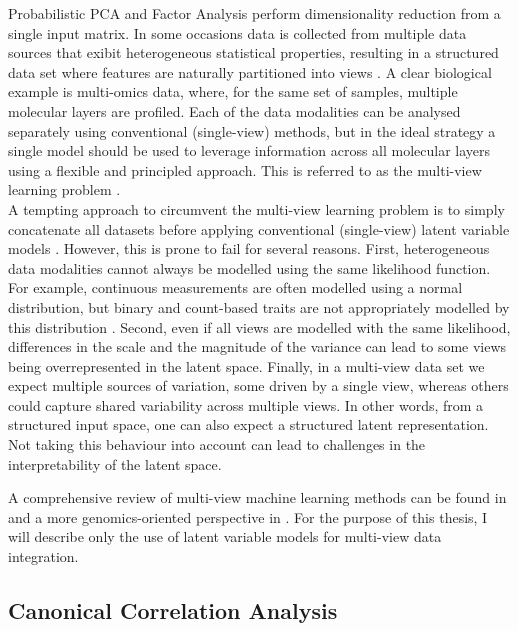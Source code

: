 Probabilistic PCA and Factor Analysis perform dimensionality reduction from a single input matrix. In some occasions data is collected from multiple data sources that exibit heterogeneous statistical properties, resulting in a structured data set where features are naturally partitioned into views \cite{Xu2013,Li2016,Zeng2018}. A clear biological example is multi-omics data, where, for the same set of samples, multiple molecular layers are profiled. Each of the data modalities can be analysed separately using conventional (single-view) methods, but in the ideal strategy a single model should be used to leverage information across all molecular layers using a flexible and principled approach. This is referred to as the multi-view learning problem \cite{Xu2013,Li2016}.\\
A tempting approach to circumvent the multi-view learning problem is to simply concatenate all datasets before applying conventional (single-view) latent variable models \cite{Ritchie2015}. However, this is prone to fail for several reasons. First, heterogeneous data modalities cannot always be modelled using the same likelihood function. For example, continuous measurements are often modelled using a normal distribution, but binary and count-based traits are not appropriately modelled by this distribution \cite{Pilling2018}. Second, even if all views are modelled with the same likelihood, differences in the scale and the magnitude of the variance can lead to some views being overrepresented in the latent space. Finally, in a multi-view data set we expect multiple sources of variation, some driven by a single view, whereas others could capture shared variability across multiple views. In other words, from a structured input space, one can also expect a structured latent representation. Not taking this behaviour into account can lead to challenges in the interpretability of the latent space.

A comprehensive review of multi-view machine learning methods can be found in \cite{Xu2013} and a more genomics-oriented perspective in \cite{Ritchie2015}. For the purpose of this thesis, I will describe only the use of latent variable models for multi-view data integration.

\subsection{Canonical Correlation Analysis} \label{cca}

